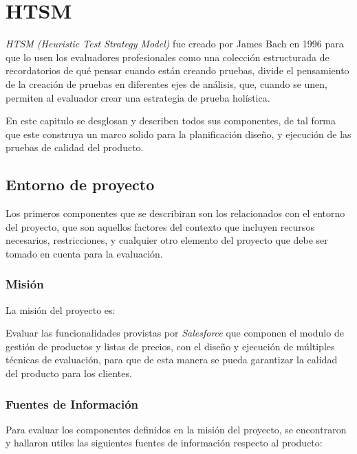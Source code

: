 \chapter{HTSM}

\emph{HTSM (Heuristic Test Strategy Model)} fue creado por James Bach en 1996
para que lo usen los evaluadores profesionales como una colección estructurada
de recordatorios de qué pensar cuando están creando pruebas, divide el
pensamiento de la creación de pruebas en diferentes ejes de análisis, que,
cuando se unen, permiten al evaluador crear una estrategia de prueba
holística\cite{Bach}.

En este capitulo se desglosan y describen todos sus componentes, de tal
forma que este construya un marco solido para la planificación diseño, y
ejecución de las pruebas de calidad del producto.

\section{Entorno de proyecto}
Los primeros componentes que se describiran son los relacionados con el entorno
del proyecto, que son aquellos factores del contexto que incluyen recursos
necesarios, restricciones, y cualquier otro elemento del proyecto que debe ser
tomado en cuenta para la evaluación.

\subsection{Misión}
La misión del proyecto es:

Evaluar las funcionalidades provistas por \emph{Salesforce} que componen el
modulo de gestión de productos y listas de precios, con el diseño y ejecución de
múltiples técnicas de evaluación, para que de esta manera se pueda garantizar la
calidad del producto para los clientes.

\subsection{Fuentes de Información}
Para evaluar los componentes definidos en la misión del proyecto, se encontraron
y hallaron utiles las siguientes fuentes de información respecto al producto:

